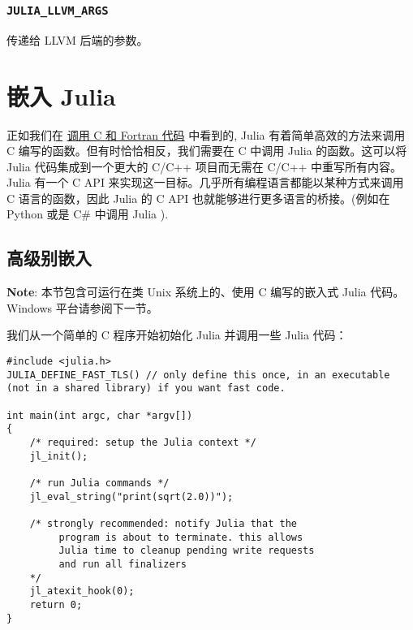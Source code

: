 \hypertarget{12744946110825549407}{}


\subsection{\texttt{JULIA\_LLVM\_ARGS}}



传递给 LLVM 后端的参数。



\hypertarget{12804520762715277004}{}


\chapter{嵌入 Julia}



正如我们在 \hyperlink{4974579121496702029}{调用 C 和 Fortran 代码} 中看到的, Julia 有着简单高效的方法来调用 C 编写的函数。但有时恰恰相反，我们需要在 C 中调用 Julia 的函数。这可以将 Julia 代码集成到一个更大的 C/C++ 项目而无需在 C/C++ 中重写所有内容。Julia 有一个 C API 来实现这一目标。几乎所有编程语言都能以某种方式来调用 C 语言的函数，因此 Julia 的 C API 也就能够进行更多语言的桥接。(例如在 Python 或是 C\# 中调用 Julia ).



\hypertarget{10185907435024062430}{}


\section{高级别嵌入}



\textbf{Note}: 本节包含可运行在类 Unix 系统上的、使用 C 编写的嵌入式 Julia 代码。Windows 平台请参阅下一节。



我们从一个简单的 C 程序开始初始化 Julia 并调用一些 Julia 代码：




\begin{lstlisting}
#include <julia.h>
JULIA_DEFINE_FAST_TLS() // only define this once, in an executable (not in a shared library) if you want fast code.

int main(int argc, char *argv[])
{
    /* required: setup the Julia context */
    jl_init();

    /* run Julia commands */
    jl_eval_string("print(sqrt(2.0))");

    /* strongly recommended: notify Julia that the
         program is about to terminate. this allows
         Julia time to cleanup pending write requests
         and run all finalizers
    */
    jl_atexit_hook(0);
    return 0;
}
\end{lstlisting}



